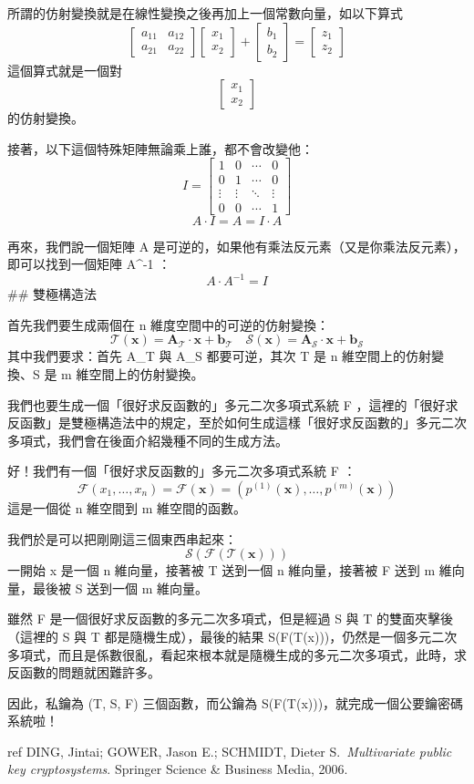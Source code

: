 \documentclass[
]{article}
\begin{document}
所謂的仿射變換就是在線性變換之後再加上一個常數向量，如以下算式 \[
\begin{bmatrix}
a_{11} & a_{12} \\
a_{21} & a_{22}
\end{bmatrix}\begin{bmatrix}
x_{1}\\x_{2}
\end{bmatrix} +\begin{bmatrix}
b_{1} \\
b_{2}
\end{bmatrix}= \begin{bmatrix}
z_{1} \\
z_{2}
\end{bmatrix}
\] 這個算式就是一個對 \[
\begin{bmatrix}
x_{1} \\
x_{2}
\end{bmatrix}
\] 的仿射變換。

接著，以下這個特殊矩陣無論乘上誰，都不會改變他： \[
I = \begin{bmatrix}
1  & 0 & \cdots & 0 \\
0  & 1 & \cdots & 0 \\ 
\vdots & \vdots & \ddots & \vdots \\
0 & 0 & \cdots & 1
\end{bmatrix}
\] \[
A\cdot I = A = I\cdot A
\]

再來，我們說一個矩陣 A
是可逆的，如果他有乘法反元素（又是你乘法反元素），即可以找到一個矩陣
A\^{}-1 ： \[
A \cdot A^{-1} = I
\] \#\# 雙極構造法

首先我們要生成兩個在 n 維度空間中的可逆的仿射變換： \[
\mathcal{T}(\mathbf{x}) = \mathbf{A}_{\mathcal{T}}\cdot \mathbf{x}+\mathbf{b}_{\mathcal{T}}
\quad
\mathcal{S}(\mathbf{x}) = \mathbf{A}_{\mathcal{S}}\cdot \mathbf{x}+\mathbf{b}_{\mathcal{S}}
\] 其中我們要求：首先 A\_T 與 A\_S 都要可逆，其次 T 是 n
維空間上的仿射變換、S 是 m 維空間上的仿射變換。

我們也要生成一個「很好求反函數的」多元二次多項式系統 F
，這裡的「很好求反函數」是雙極構造法中的規定，至於如何生成這樣「很好求反函數的」多元二次多項式，我們會在後面介紹幾種不同的生成方法。

好！我們有一個「很好求反函數的」多元二次多項式系統 F ： \[
\mathcal{F} (x_{1},\dots,x_{n}) =\mathcal{F}(\mathbf{x})= 
(p^{(1)}(\mathbf{x}),\dots,p^{(m)}(\mathbf{x}))
\] 這是一個從 n 維空間到 m 維空間的函數。

我們於是可以把剛剛這三個東西串起來： \[
\mathcal{S}(\mathcal{F}(\mathcal{T}(\mathbf{x})))
\] 一開始 x 是一個 n 維向量，接著被 T 送到一個 n 維向量，接著被 F 送到 m
維向量，最後被 S 送到一個 m 維向量。

雖然 F 是一個很好求反函數的多元二次多項式，但是經過 S 與 T
的雙面夾擊後（這裡的 S 與 T 都是隨機生成），最後的結果
S(F(T(x)))，仍然是一個多元二次多項式，而且是係數很亂，看起來根本就是隨機生成的多元二次多項式，此時，求反函數的問題就困難許多。

因此，私鑰為 (T, S, F) 三個函數，而公鑰為
S(F(T(x)))，就完成一個公要鑰密碼系統啦！

ref DING, Jintai; GOWER, Jason E.; SCHMIDT, Dieter S.~\emph{Multivariate
public key cryptosystems}. Springer Science \& Business Media, 2006.
\end{document}
